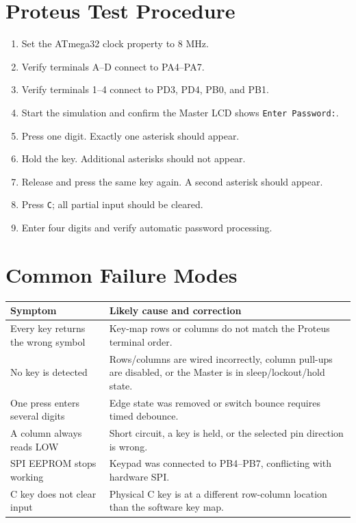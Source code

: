 \documentclass[11pt,a4paper]{article}
\begin{document}
\section{Proteus Test Procedure}
\begin{enumerate}
  \item Set the ATmega32 clock property to 8 MHz.
  \item Verify terminals A--D connect to PA4--PA7.
  \item Verify terminals 1--4 connect to PD3, PD4, PB0, and PB1.
  \item Start the simulation and confirm the Master LCD shows \texttt{Enter Password:}.
  \item Press one digit. Exactly one asterisk should appear.
  \item Hold the key. Additional asterisks should not appear.
  \item Release and press the same key again. A second asterisk should appear.
  \item Press \texttt{C}; all partial input should be cleared.
  \item Enter four digits and verify automatic password processing.
\end{enumerate}

\section{Common Failure Modes}
\begin{longtable}{p{}p{}}
\toprule
Symptom & Likely cause and correction \\
\midrule
\endhead
Every key returns the wrong symbol & Key-map rows or columns do not match the Proteus terminal order. \\
No key is detected & Rows/columns are wired incorrectly, column pull-ups are disabled, or the Master is in sleep/lockout/hold state. \\
One press enters several digits & Edge state was removed or switch bounce requires timed debounce. \\
A column always reads LOW & Short circuit, a key is held, or the selected pin direction is wrong. \\
SPI EEPROM stops working & Keypad was connected to PB4--PB7, conflicting with hardware SPI. \\
C key does not clear input & Physical C key is at a different row-column location than the software key map. \\
\bottomrule
\end{longtable}
\end{document}
